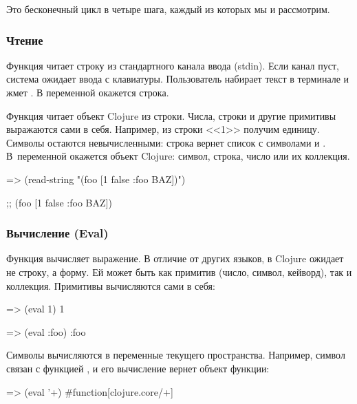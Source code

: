 Это бесконечный цикл в четыре шага, каждый из которых мы и рассмотрим.

\subsubsection{Чтение}

Функция  читает строку из стандартного канала ввода (stdin). Если канал пуст, система ожидает ввода с клавиатуры. Пользователь набирает текст в терминале и жмет \enter. В переменной  окажется строка.

Функция  читает объект Clojure из строки. Числа, строки и другие примитивы выражаются сами в себя. Например, из строки <<1>> получим единицу. Символы остаются невычисленными: строка  вернет список с символами  и . В~переменной  окажется объект Clojure: символ, строка, число или их коллекция.

\begin{english}
  \begin{clojure}
=> (read-string "(foo [1 false {:foo BAZ}])")

;; (foo [1 false {:foo BAZ}])
  \end{clojure}
\end{english}

\subsubsection{Вычисление (Eval)}

Функция  вычисляет выражение. В отличие от других языков, в Clojure  ожидает не строку, а форму. Ей может быть как примитив (число, символ, кейворд), так и коллекция. Примитивы вычисляются сами в себя:

\begin{english}
  \begin{clojure}
=> (eval 1)
1

=> (eval :foo)
:foo
  \end{clojure}
\end{english}
Символы вычисляются в переменные текущего пространства. Например, символ \code{+}
связан с функцией , и его вычисление вернет объект функции:

\begin{english}
  \begin{clojure}
=> (eval '+)
#function[clojure.core/+]
  \end{clojure}
\end{english}

